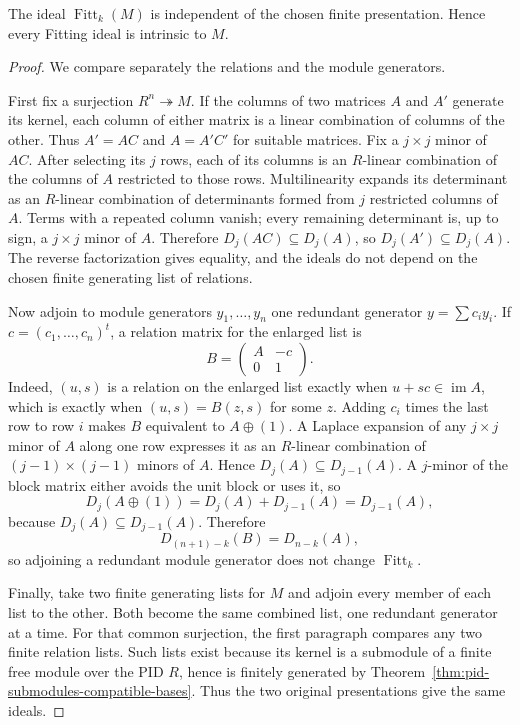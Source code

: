 \begin{theorem}
\label{thm:fitting-presentation-independent}
The ideal \(\operatorname{Fitt}_k(M)\) is independent of the chosen finite
presentation. Hence every Fitting ideal is intrinsic to \(M\).
\end{theorem}
\begin{proof}
We compare separately the relations and the module generators.

First fix a surjection \(R^n\twoheadrightarrow M\). If the columns of two
matrices \(A\) and \(A'\) generate its kernel, each column of either matrix is
a linear combination of columns of the other. Thus \(A'=AC\) and \(A=A'C'\)
for suitable matrices. Fix a \(j\times j\) minor of \(AC\). After selecting
its \(j\) rows, each of its columns is an \(R\)-linear combination of the
columns of \(A\) restricted to those rows. Multilinearity expands its
determinant as an \(R\)-linear combination of determinants formed from \(j\)
restricted columns of \(A\). Terms with a repeated column vanish; every
remaining determinant is, up to sign, a \(j\times j\) minor of \(A\).
Therefore \(D_j(AC)\subseteq D_j(A)\), so
\(D_j(A')\subseteq D_j(A)\). The reverse factorization gives equality, and
the ideals do not depend on the chosen finite generating list of relations.

Now adjoin to module generators \(y_1,\ldots,y_n\) one redundant generator
\(y=\sum c_i y_i\). If \(c=(c_1,\ldots,c_n)^t\), a relation matrix for the
enlarged list is
\[
B=\begin{pmatrix}A&-c\\0&1\end{pmatrix}.
\]
Indeed, \((u,s)\) is a relation on the enlarged list exactly when
\(u+sc\in\operatorname{im}A\), which is exactly when
\((u,s)=B(z,s)\) for some \(z\).
Adding \(c_i\) times the last row to row \(i\) makes \(B\) equivalent to
\(A\oplus(1)\). A Laplace expansion of any \(j\times j\) minor of \(A\)
along one row expresses it as an \(R\)-linear combination of
\((j-1)\times(j-1)\) minors of \(A\). Hence
\(D_j(A)\subseteq D_{j-1}(A)\). A \(j\)-minor of the block matrix either avoids the unit
block or uses it, so
\[
D_j(A\oplus(1))=D_j(A)+D_{j-1}(A)=D_{j-1}(A),
\]
because \(D_j(A)\subseteq D_{j-1}(A)\). Therefore
\[
D_{(n+1)-k}(B)=D_{n-k}(A),
\]
so adjoining a redundant module generator does not change
\(\operatorname{Fitt}_k\).

Finally, take two finite generating lists for \(M\) and adjoin every member
of each list to the other. Both become the same combined list, one redundant
generator at a time. For that common surjection, the first paragraph compares
any two finite relation lists. Such lists exist because its kernel is a
submodule of a finite free module over the PID \(R\), hence is finitely
generated by Theorem~\ref{thm:pid-submodules-compatible-bases}. Thus the two
original presentations give the same ideals.
\end{proof}

